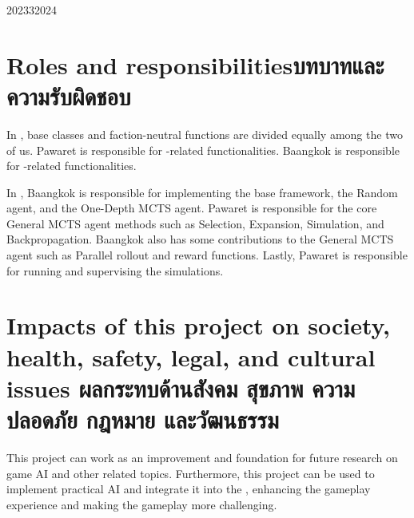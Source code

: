 \begin{plan}{6}{2023}{3}{2024}
\end{plan}

\section{\ifenglish Roles and responsibilities\else บทบาทและความรับผิดชอบ\fi}
In \RootOurs{}, base classes and faction-neutral functions are divided equally among the two of us. Pawaret is responsible for \Marquise{}-related functionalities. Baangkok is responsible for \Eyrie{}-related functionalities.

In \RootAI, Baangkok is responsible for implementing the base framework, the Random agent, and the One-Depth MCTS agent. Pawaret is responsible for the core General MCTS agent methods such as Selection, Expansion, Simulation, and Backpropagation. Baangkok also has some contributions to the General MCTS agent such as Parallel rollout and reward functions. Lastly, Pawaret is responsible for running and supervising the simulations.



\section{\ifenglish%
Impacts of this project on society, health, safety, legal, and cultural issues
\else%
ผลกระทบด้านสังคม สุขภาพ ความปลอดภัย กฎหมาย และวัฒนธรรม
\fi}
This project can work as an improvement and foundation for future research on game AI and other related topics. Furthermore, this project can be used to implement practical AI and integrate it into the \RootV, enhancing the gameplay experience and making the gameplay more challenging.
